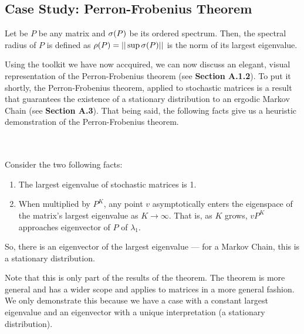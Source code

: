 \newpage
\subsection{Case Study: Perron-Frobenius Theorem}

\begin{definition}
  Let be $P$ be any matrix and $\sigma(P)$ be its ordered spectrum. Then, the spectral radius of $P$ is defined as $\rho(P) = ||\sup \sigma(P)||$ is the norm of its largest eigenvalue.
\end{definition}


Using the toolkit we have now accquired, we can now discuss an elegant, visual representation of the Perron-Frobenius theorem (see \textbf{Section A.1.2}).
To put it shortly, the Perron-Frobenius theorem, applied to stochastic matrices is a result that guarantees the existence of a stationary distribution to an ergodic Markov Chain (see \textbf{Section A.3}).
That being said, the following facts give us a heuristic demonstration of the Perron-Frobenius theorem.

\begin{theorem} \hfill
  \vspace{-1em}
  \\ \\ Consider the two following facts:
  \begin{enumerate}
    \item The largest eigenvalue of stochastic matrices is 1.
    \item When multiplied by $P^K$, any point $v$ asymptotically enters the eigenspace of the matrix's largest eigenvalue as $K \to \infty$. That is, as $K$ grows, $v P^K$ approaches eigenvector of $P$ of $\lambda_1$.
  \end{enumerate}
So, there is an eigenvector of the largest eigenvalue --- for a Markov Chain, this is a stationary distribution.
\end{theorem}

\begin{note}
  Note that this is only part of the results of the theorem. The theorem is more general and has a wider scope and applies to matrices in a more general fashion.
  We only demonstrate this because we have a case with a constant largest eigenvalue and an eigenvector with a unique interpretation (a stationary distribution).
\end{note}

